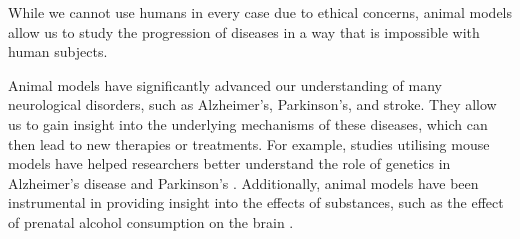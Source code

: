\documentclass[10pt]{article}
\begin{document}
\begin{sloppypar}
  \vspace{10pt} %
  \begin{table}[ht]
    \centering
    \renewcommand{\arraystretch}{1.5}
    \setlength{\tabcolsep}{12pt}
    \caption{Overview of in vitro, in vivo, and in silico research methods.}
    \label{tab:overview-research-methods}
  \end{table}

  While we cannot use humans in every case due to ethical concerns, animal models allow us to study the progression of diseases in a way that is impossible with human subjects.

  Animal models have significantly advanced our understanding of many neurological disorders, such as Alzheimer’s, Parkinson’s, and stroke. They allow us to gain insight into the underlying mechanisms of these diseases, which can then lead to new therapies or treatments. For example, studies utilising mouse models have helped researchers better understand the role of genetics in Alzheimer’s disease \citep{holtzman_alzheimers_2011} and Parkinson’s \citep{hernandez_genetics_2016}. Additionally, animal models have been instrumental in providing insight into the effects of substances, such as the effect of prenatal alcohol consumption on the brain \citep{bisen_proteomic_2019}.


\end{sloppypar}
\end{document}
